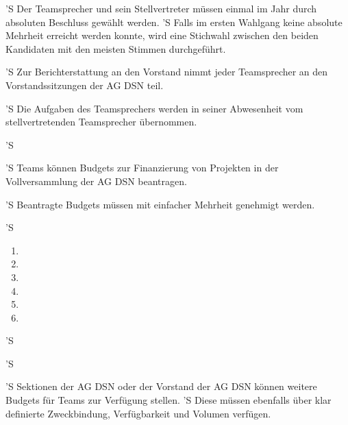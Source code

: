 \documentclass[draft,parskip=half-,DIV=12,mpinclude]{scrartcl}
\begin{document}
\begin{contract}
'S Der Teamsprecher und sein Stellvertreter müssen einmal im Jahr durch absoluten Beschluss gewählt werden.
'S Falls im ersten Wahlgang keine absolute Mehrheit erreicht werden konnte, wird eine Stichwahl zwischen den beiden Kandidaten mit den meisten Stimmen durchgeführt.

'S Zur Berichterstattung an den Vorstand nimmt jeder Teamsprecher an den Vorstandssitzungen der AG DSN teil.

'S Die Aufgaben des Teamsprechers werden in seiner Abwesenheit vom stellvertretenden Teamsprecher übernommen.

'S 


'S Teams können Budgets zur Finanzierung von Projekten in der Vollversammlung der AG DSN beantragen.

'S Beantragte Budgets müssen mit einfacher Mehrheit genehmigt werden.

'S 
\begin{enumerate}
  \item {}
  \item {}
  \item {}
  \item {}
  \item {}
  \item {}
\end{enumerate}


'S 

'S 

'S Sektionen der AG DSN oder der Vorstand der AG DSN können weitere Budgets für Teams zur Verfügung stellen.
'S Diese müssen ebenfalls über klar definierte Zweckbindung, Verfügbarkeit und Volumen verfügen.


\end{contract}
\end{document}

